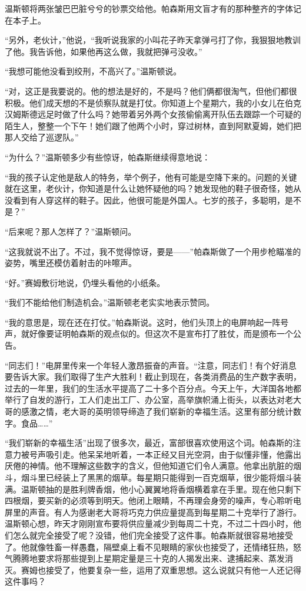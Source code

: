 温斯顿将两张皱巴巴脏兮兮的钞票交给他。帕森斯用文盲才有的那种整齐的字体记在本子上。

``另外，老伙计，''他说，``我听说我家的小叫花子昨天拿弹弓打了你，我狠狠地教训了他。我告诉他，如果他再这么做，我就把弹弓没收。''

``我想可能他没看到绞刑，不高兴了。''温斯顿说。

``对，这正是我要说的。他的想法是好的，不是吗？他们俩都很淘气，但他们都很积极。他们成天想的不是侦察队就是打仗。你知道上个星期六，我的小女儿在伯克汉姆斯德远足时做了什么吗？她带着另外两个女孩偷偷离开队伍去跟踪一个可疑的陌生人，整整一个下午！她们跟了他两个小时，穿过树林，直到阿默夏姆，她们把那人交给了巡逻队。''

``为什么？''温斯顿多少有些惊讶，帕森斯继续得意地说：

``我的孩子认定他是敌人的特务，举个例子，他有可能是空降下来的。问题的关键就在这里，老伙计，你知道是什么让她怀疑他的吗？她发现他的鞋子很奇怪，她从没看到有人穿这样的鞋子。因此，他很可能是外国人。七岁的孩子，多聪明，是不是？''

``后来呢？那人怎样了？''温斯顿问。

``这我就说不出了。不过，我不觉得惊讶，要是------''帕森斯做了一个用步枪瞄准的姿势，嘴里还模仿着射击的咔嚓声。

``好。''赛姆敷衍地说，仍埋头看他的小纸条。

``我们不能给他们制造机会。''温斯顿老老实实地表示赞同。

``我的意思是，现在还在打仗。''帕森斯说。这时，他们头顶上的电屏响起一阵号声，就好像要证明帕森斯的观点似的。但这次不是宣布打了胜仗，而是颁布一个公告。

``同志们！''电屏里传来一个年轻人激昂振奋的声音。``注意，同志们！有个好消息要告诉大家。我们取得了生产大胜利！截止到现在，各类消费品的生产数字表明，过去的一年里，我们的生活水平提高了二十多个百分点。今天上午，大洋国各地都举行了自发的游行，工人们走出工厂、办公室，高举旗帜涌上街头，以表达对老大哥的感激之情，老大哥的英明领导缔造了我们崭新的幸福生活。这里有部分统计数字。食品\ldots\ldots''

``我们崭新的幸福生活''出现了很多次，最近，富部很喜欢使用这个词。帕森斯的注意力被号声吸引走。他呆呆地听着，一本正经又目光空洞，由于似懂非懂，他露出厌倦的神情。他不理解这些数字的含义，但他知道它们令人满意。他拿出肮脏的烟斗，烟斗里已经装上了黑黑的烟草。每星期只能得到一百克烟草，很少能将烟斗装满。温斯顿抽的是胜利牌香烟，他小心翼翼地将香烟横着拿在手里。现在他只剩下四根烟，要买新的必须等到明天。他闭上眼睛，不再理会身旁的噪声，专心聆听电屏里的声音。有人为感谢老大哥将巧克力供应量提高到每星期二十克举行了游行。温斯顿心想，昨天才刚刚宣布要将供应量减少到每周二十克，不过二十四小时，他们怎么就完全接受了呢？没错，他们完全接受了这件事。帕森斯就很容易地接受了。他就像牲畜一样愚蠢，隔壁桌上看不见眼睛的家伙也接受了，还情绪狂热，怒气腾腾地要求将那些提到上星期定量是三十克的人揭发出来、逮捕起来、蒸发消灭。赛姆也接受了，他要复杂一些，运用了双重思想。这么说就只有他一人还记得这件事吗？

